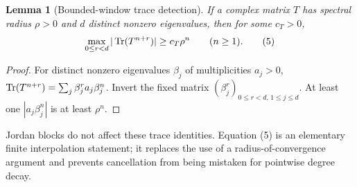 \documentclass[11pt]{article}
\newtheorem{lemma}[theorem]{Lemma}
\begin{document}
\begin{lemma}[Bounded-window trace detection]\label{window}
If a complex matrix $T$ has spectral radius $\rho>0$ and $d$ distinct
nonzero eigenvalues, then for some $c_T>0$,
\[
 \max_{0\le r<d}|\operatorname{Tr}(T^{n+r})|\ge c_T\rho^n\qquad(n\ge1).
 \tag{5}
\]
\end{lemma}
\begin{proof}
For distinct nonzero eigenvalues $\beta_j$ of multiplicities $a_j>0$,
$\operatorname{Tr}(T^{n+r})=\sum_j\beta_j^r a_j\beta_j^n$.
Invert the fixed matrix $(\beta_j^r)_{0\le r<d,\,1\le j\le d}$.
At least one $|a_j\beta_j^n|$ is at least $\rho^n$.
\end{proof}
Jordan blocks do not affect these trace identities. Equation (5) is an
elementary finite interpolation statement; it replaces the use of a
radius-of-convergence argument and prevents cancellation from being
mistaken for pointwise degree decay.
\end{document}
